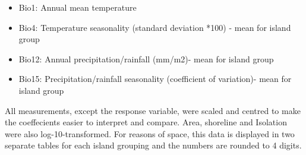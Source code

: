 \documentclass[a4paper,10pt]{article} %
\begin{document}

\begin{itemize}
\item Bio1: Annual mean temperature
\item Bio4: Temperature seasonality (standard deviation *100) - mean for island group
\item Bio12: Annual precipitation/rainfall (mm/m2)- mean for island group
\item Bio15: Precipitation/rainfall seasonality (coefficient of variation)- mean for island group
\end{itemize}

All measurements, except the response variable, were scaled and centred to make the coeffecients easier to interpret and compare. Area, shoreline and Isolation were also log-10-transformed. For reasons of space, this data is displayed in two separate tables for each island grouping and the numbers are rounded to 4 digits.
\end{document}
